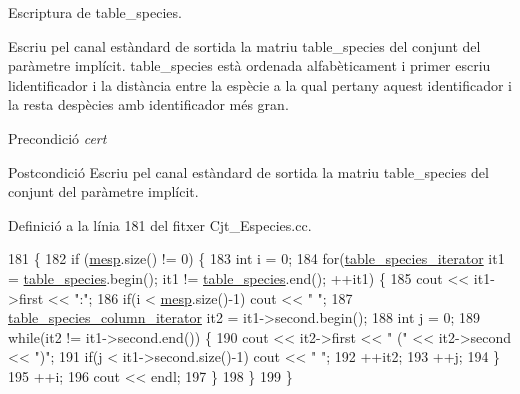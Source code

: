 Escriptura de table\+\_\+species. 

Escriu pel canal estàndard de sortida la matriu table\+\_\+species del conjunt del paràmetre implícit. table\+\_\+species està ordenada alfabèticament i primer escriu l\textquotesingle{}identificador i la distància entre la espècie a la qual pertany aquest identificador i la resta d\textquotesingle{}espècies amb identificador més gran.

\begin{DoxyPrecond}{Precondició}
{\itshape cert} 
\end{DoxyPrecond}
\begin{DoxyPostcond}{Postcondició}
Escriu pel canal estàndard de sortida la matriu table\+\_\+species del conjunt del paràmetre implícit. 
\end{DoxyPostcond}


Definició a la línia 181 del fitxer Cjt\+\_\+\+Especies.\+cc.


\begin{DoxyCode}
181                                        \{
182     \textcolor{keywordflow}{if} (\hyperlink{class_cjt___especies_a64a525b38c78935e7432b362ea9a2306}{mesp}.size() != 0) \{
183         \textcolor{keywordtype}{int} i = 0;
184         \textcolor{keywordflow}{for}(\hyperlink{class_cjt___especies_a5da209bb73685ff7a89041202bcdd8c7}{table\_species\_iterator} it1 = \hyperlink{class_cjt___especies_ae56d242080836b8d3db505f0a8623090}{table\_species}.begin(); it1 != 
      \hyperlink{class_cjt___especies_ae56d242080836b8d3db505f0a8623090}{table\_species}.end(); ++it1) \{
185             cout << it1->first << \textcolor{stringliteral}{":"};
186             \textcolor{keywordflow}{if}(i < \hyperlink{class_cjt___especies_a64a525b38c78935e7432b362ea9a2306}{mesp}.size()-1) cout << \textcolor{stringliteral}{" "};
187             \hyperlink{class_cjt___especies_a11316f4de57c3d78183137abe33b31c5}{table\_species\_column\_iterator} it2 = it1->second.begin();
188             \textcolor{keywordtype}{int} j = 0;
189             \textcolor{keywordflow}{while}(it2 != it1->second.end()) \{
190                 cout << it2->first << \textcolor{stringliteral}{" ("} << it2->second << \textcolor{stringliteral}{")"};
191                 \textcolor{keywordflow}{if}(j < it1->second.size()-1) cout << \textcolor{stringliteral}{" "};
192                 ++it2;
193                 ++j;
194             \}
195             ++i;
196             cout << endl;
197         \}
198     \}
199 \}
\end{DoxyCode}


